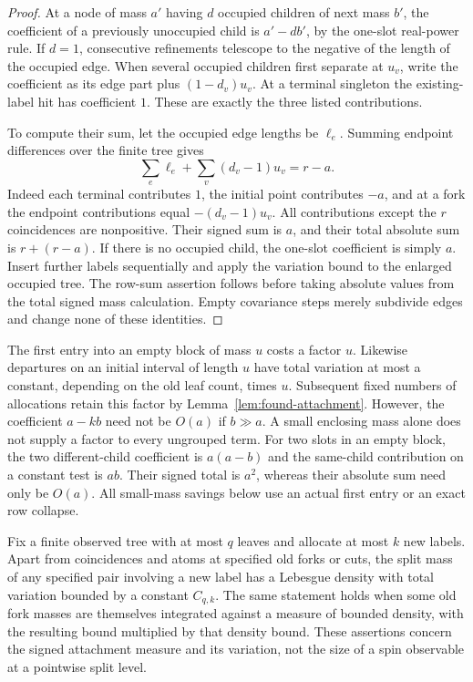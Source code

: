 \begin{proof}
At a node of mass $a'$ having $d$ occupied children of next mass $b'$,
the coefficient of a previously unoccupied child is $a'-db'$, by the
one-slot real-power rule. If $d=1$, consecutive refinements telescope to
the negative of the length of the occupied edge. When several occupied
children first separate at $u_v$, write the coefficient as its edge
part plus $(1-d_v)u_v$. At a terminal singleton the existing-label hit
has coefficient $1$. These are exactly the three listed contributions.

To compute their sum, let the occupied edge lengths be $\ell_e$.
Summing endpoint differences over the finite tree gives
\[
 \sum_e\ell_e+\sum_v(d_v-1)u_v=r-a.
\]
Indeed each terminal contributes $1$, the initial point contributes
$-a$, and at a fork the endpoint contributions equal
$-(d_v-1)u_v$. All contributions except the $r$ coincidences are
nonpositive. Their signed sum is $a$, and their total absolute sum is
$r+(r-a)$. If there is no occupied child, the one-slot coefficient is
simply $a$. Insert further labels sequentially and apply the variation
bound to the enlarged occupied tree. The row-sum assertion follows
before taking absolute values from the total signed mass calculation.
Empty covariance steps merely subdivide edges and change none of these
identities.
\end{proof}

\begin{remark}
The first entry into an empty block of mass $u$ costs a factor $u$.
Likewise departures on an initial interval of length $u$ have total
variation at most a constant, depending on the old leaf count, times
$u$. Subsequent fixed numbers of allocations retain this factor by
Lemma~\ref{lem:found-attachment}. However, the coefficient
$a-kb$ need not be $O(a)$ if $b\gg a$. A small enclosing mass alone
does not supply a factor to every ungrouped term. For two slots in an
empty block, the two different-child coefficient is $a(a-b)$ and the
same-child contribution on a constant test is $ab$. Their signed total
is $a^2$, whereas their absolute sum need only be $O(a)$. All small-mass
savings below use an actual first entry or an exact row collapse.
\end{remark}

\begin{lemma}\label{lem:found-split-density}
Fix a finite observed tree with at most $q$ leaves and allocate at most
$k$ new labels. Apart from coincidences and atoms at specified old forks
or cuts, the split mass of any specified pair involving a new label has
a Lebesgue density with total variation bounded by a constant $C_{q,k}$.
The same statement holds when some old fork masses are themselves
integrated against a measure of bounded density, with the resulting
bound multiplied by that density bound. These assertions concern the
signed attachment measure and its variation, not the size of a
spin observable at a pointwise split level.
\end{lemma}

